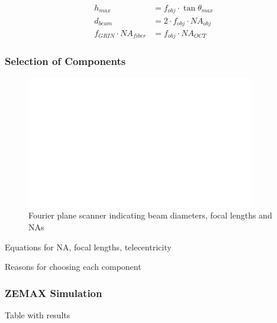 \begin{align}
h_{max} &= f_{obj}\cdot \tan  \theta_{max} \\
d_{beam} &= 2 \cdot f_{obj}\cdot \mathit{NA_{obj}} \\
f_{GRIN} \cdot \mathit{NA_{fiber}} &= f_{obj} \cdot \mathit{NA_{OCT}}
\label{eq:fpsNA}
\end{align}


\subsubsection{Selection of Components}
\begin{figure}[h!]\centering \includegraphics[width=10cm,draft]{figures/foo.png}
      \caption{Fourier plane scanner indicating beam diameters, focal lengths and NAs}
\end{figure}

Equations for NA, focal lengths, telecentricity

Reasons for choosing each component

\subsubsection{ZEMAX Simulation}

Table with results

